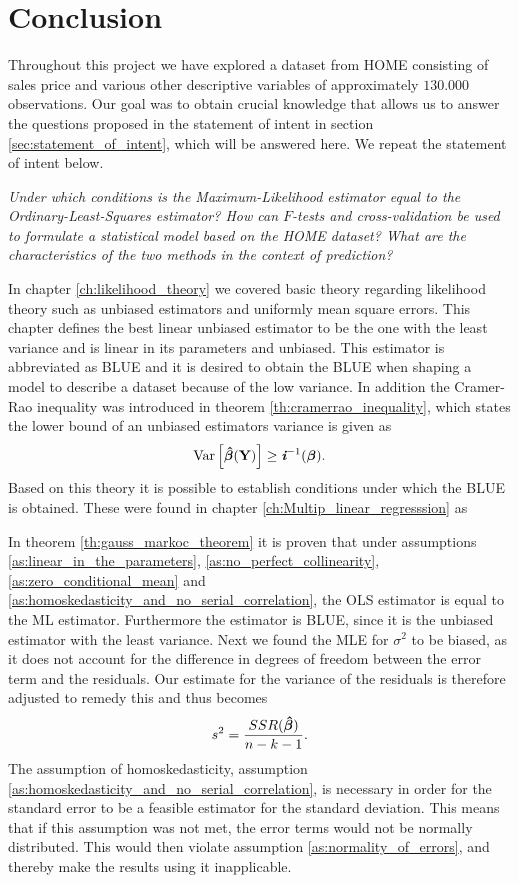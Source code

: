 \chapter{Conclusion}\label{ch:conclusion}
Throughout this project we have explored a dataset from HOME consisting of sales price and various other descriptive variables of approximately $130.000$ observations. Our goal was to obtain crucial knowledge that allows us to answer the questions proposed in the statement of intent in section \ref{sec:statement_of_intent}, which will be answered here. We repeat the statement of intent below. 

\textit{Under which conditions is the Maximum-Likelihood estimator equal to the Ordinary-Least-Squares estimator?
How can $F$-tests and cross-validation be used to formulate a statistical model based on the HOME dataset?
What are the characteristics of the two methods in the context of prediction?}

In chapter \ref{ch:likelihood_theory} we covered basic theory regarding likelihood theory such as unbiased estimators and uniformly mean square errors. This chapter defines the best linear unbiased estimator to be the one with the least variance and is linear in its parameters and unbiased. This estimator is abbreviated as BLUE and it is desired to obtain the BLUE when shaping a model to describe a dataset because of the low variance. 
In addition the Cramer-Rao inequality was introduced in theorem \ref{th:cramerrao_inequality}, which states the lower bound of an unbiased estimators variance is given as
\begin{align*} 
    \operatorname{\text{Var}} \Big[ \boldsymbol{\hat{\beta}}(\textbf{Y})\Big] \geq \textit{\textbf{i}}^{-1}(\boldsymbol{\beta}).
\end{align*}
Based on this theory it is possible to establish conditions under which the BLUE is obtained. 
These were found in chapter \ref{ch:Multip_linear_regresssion} as

In theorem \ref{th:gauss_markoc_theorem} it is proven that under assumptions \ref{as:linear_in_the_parameters}, \ref{as:no_perfect_collinearity}, \ref{as:zero_conditional_mean} and \ref{as:homoskedasticity_and_no_serial_correlation}, the OLS estimator is equal to the ML estimator.
Furthermore the estimator is BLUE, since it is the unbiased estimator with the least variance.
Next we found the MLE for $\sigma^2$ to be biased, as it does not account for the difference in degrees of freedom between the error term and the residuals.
Our estimate for the variance of the residuals is therefore adjusted to remedy this and thus becomes
\begin{align*} \label{eq:sigma_hat_2_n-k-1}
    s^2 = \frac{SSR(\operatorname{\boldsymbol{\hat{\beta}}})}{n - k - 1}.
\end{align*}
The assumption of homoskedasticity, assumption \ref{as:homoskedasticity_and_no_serial_correlation}, is necessary in order for the standard error to be a feasible estimator for the standard deviation.
This means that if this assumption was not met, the error terms would not be normally distributed.
This would then violate assumption \ref{as:normality_of_errors}, and thereby make the results using it inapplicable. 


